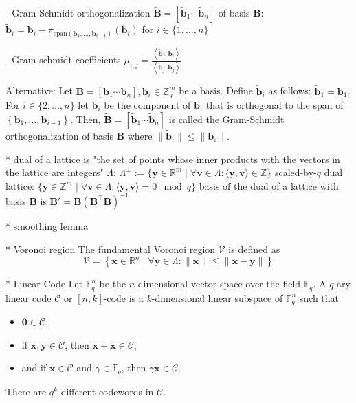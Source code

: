 \documentclass[
  a4paper,  %
  twoside,  %
  bibliography=totoc,
  headsepline,
  cleardoublepage=empty,
  parskip=half,
  draft=false
]{scrbook}
\begin{document}
    - Gram-Schmidt orthogonalization $\tilde{\mathbf{B}} = \left[\tilde{\mathbf{b}}_1 \cdots \tilde{\mathbf{b}}_n\right]$ of basis $\mathbf{B}$: $\tilde{\mathbf{b}}_i = \mathbf{b}_i - \pi_{\text{span}(\mathbf{b}_1, \ldots, \mathbf{b}_{i-1})}(\mathbf{b}_i)$ for $i \in \{1, \ldots, n\}$ 

    - Gram-schmidt coefficients $\mu_{i, j} = \frac{\left\langle \tilde{\mathbf{b}}_j, \mathbf{b}_i\right\rangle}{\left\langle \tilde{\mathbf{b}}_j, \tilde{\mathbf{b}}_j\right\rangle}$ %

    Alternative:
    Let $\mathbf{B} = \left[\mathbf{b}_1 \cdots \mathbf{b}_n\right], \mathbf{b}_i \in \mathbb{Z}_q^{m}$ be a basis. Define $\tilde{\mathbf{b}}_i$ as follows: $\tilde{\mathbf{b}}_1 = \mathbf{b}_1$. For $i \in \{2, \ldots, n\}$ let $\tilde{\mathbf{b}}_i$ be the component of $\mathbf{b}_i$ that is orthogonal to the span of $\left\{\mathbf{b}_1, \ldots, \mathbf{b}_{i-1}\right\}$. Then,  $\tilde{\mathbf{B}} = \left[\tilde{\mathbf{b}}_1 \cdots \tilde{\mathbf{b}}_n\right]$ is called the Gram-Schmidt orthogonalization of basis $\mathbf{B}$ where $\| \tilde{\mathbf{b}}_i\| \leq \| \mathbf{b}_i\|$. 

  
  * dual of a lattice is "the set of points whose inner products with the vectors in the lattice are integers" $\Lambda$: $\Lambda^{\perp} := \{ \mathbf{y} \in \mathbb{R}^m \mid \forall \mathbf{v} \in \Lambda: \langle \mathbf{y}, \mathbf{v} \rangle \in \mathbb{Z}\}$
    scaled-by-$q$ dual lattice:  $\{ \mathbf{y} \in \mathbb{Z}^m \mid \forall \mathbf{v} \in \Lambda: \langle \mathbf{y}, \mathbf{v} \rangle = 0 \mod q\}$ %
    basis of the dual of a lattice with basis $\mathbf{B}$ is $\mathbf{B'} = \mathbf{B} (\mathbf{B}^\intercal \mathbf{B})^{-1}$ %

  * smoothing lemma

  * Voronoi region %
  The fundamental Voronoi region $\mathcal{V}$ is defined as 
  \begin{equation}
    \mathcal{V} = \left\{ \mathbf{x} \in \mathbb{R}^n \mid \forall \mathbf{y} \in \Lambda : \| \mathbf{x} \| \leq \| \mathbf{x} - \mathbf{y} \| \right\}
  \end{equation}

  * Linear Code \cite{VanLint12} %
    Let $\mathbb{F}_q^n$ be the $n$-dimensional vector space over the field $\mathbb{F}_q$. A $q$-ary linear code $\mathcal{C}$ or $[n, k]$-code is a $k$-dimensional linear subspace of $\mathbb{F}_q^n$ such that 
    \begin{itemize}
      \item $\mathbf{0} \in \mathcal{C}$,
      \item if $\mathbf{x}, \mathbf{y} \in \mathcal{C}$, then $\mathbf{x} + \mathbf{x} \in \mathcal{C}$,
      \item and if $\mathbf{x} \in \mathcal{C}$ and $\gamma \in \mathbb{F}_q$, then $\gamma \mathbf{x} \in \mathcal{C}$.
    \end{itemize}
    There are $q^k$ different codewords in $\mathcal{C}$.
\end{document}
